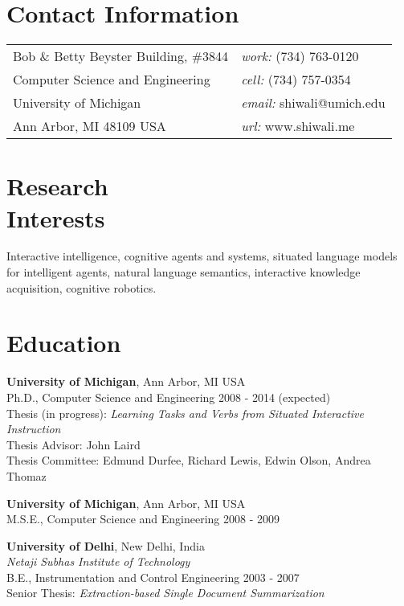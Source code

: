 \documentclass[margin,line,11pt]{res}
\begin{document}

\thispagestyle{empty}
\begin{resume}
\section{\sc Contact Information}
\vspace{.05in}
\begin{tabular}{@{}p{3in}p{4in}}
Bob \& Betty Beyster Building, \#3844             & {\it work:}  (734) 763-0120 \\            
Computer Science and Engineering                  & {\it cell:}    (734) 757-0354 \\         
University of Michigan                            & {\it email:}  shiwali@umich.edu\\       
Ann Arbor, MI  48109 USA                          & {\it url:} www.shiwali.me \\     
\end{tabular}


\section{\sc Research \\Interests}
Interactive intelligence, cognitive agents and systems, situated
language models for intelligent agents, natural language semantics,
interactive knowledge acquisition, cognitive robotics.

\section{\sc Education}
{\bf University of Michigan}, Ann Arbor, MI USA\\
Ph.D., Computer Science and Engineering \hfill 2008 - 2014 (expected)\\
Thesis (in progress):  \emph{Learning Tasks and Verbs from Situated Interactive Instruction} \\
Thesis Advisor:  John Laird \\
Thesis Committee: Edmund Durfee, Richard Lewis, Edwin Olson, Andrea Thomaz

{\bf University of Michigan}, Ann Arbor, MI USA\\
M.S.E., Computer Science and Engineering \hfill 2008 - 2009

{\bf University of Delhi}, New Delhi, India\\
{\em Netaji Subhas Institute of Technology}\\
B.E.,  Instrumentation and Control Engineering \hfill 2003 - 2007\\ 
Senior Thesis: \emph{Extraction-based Single Document Summarization}




\end{resume}
\end{document}
